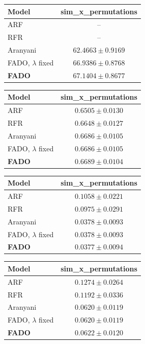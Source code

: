 \begin{tabular}{lc}
\toprule
\textbf{Model} & sim\_x\_permutations \\
\midrule
ARF & -- \\
RFR & -- \\
Aranyani & $62.4663 \pm 0.9169$ \\
FADO, $\lambda$ fixed & $66.9386 \pm 0.8768$ \\
\textbf{FADO} & $67.1404 \pm 0.8677$ \\
\bottomrule
\end{tabular}

\begin{tabular}{lc}
\toprule
\textbf{Model} & sim\_x\_permutations \\
\midrule
ARF & $0.6505 \pm 0.0130$ \\
RFR & $0.6648 \pm 0.0127$ \\
Aranyani & $0.6686 \pm 0.0105$ \\
FADO, $\lambda$ fixed & $0.6686 \pm 0.0105$ \\
\textbf{FADO} & $0.6689 \pm 0.0104$ \\
\bottomrule
\end{tabular}

\begin{tabular}{lc}
\toprule
\textbf{Model} & sim\_x\_permutations \\
\midrule
ARF & $0.1058 \pm 0.0221$ \\
RFR & $0.0975 \pm 0.0291$ \\
Aranyani & $0.0378 \pm 0.0093$ \\
FADO, $\lambda$ fixed & $0.0378 \pm 0.0093$ \\
\textbf{FADO} & $0.0377 \pm 0.0094$ \\
\bottomrule
\end{tabular}

\begin{tabular}{lc}
\toprule
\textbf{Model} & sim\_x\_permutations \\
\midrule
ARF & $0.1274 \pm 0.0264$ \\
RFR & $0.1192 \pm 0.0336$ \\
Aranyani & $0.0620 \pm 0.0119$ \\
FADO, $\lambda$ fixed & $0.0620 \pm 0.0119$ \\
\textbf{FADO} & $0.0622 \pm 0.0120$ \\
\bottomrule
\end{tabular}

